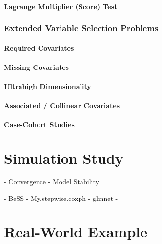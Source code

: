 \subsection{Lagrange Multiplier (Score) Test}

\section{Extended Variable Selection Problems}
\subsection{Required Covariates}
\subsection{Missing Covariates}
\subsection{Ultrahigh Dimensionality}
\subsection{Associated / Collinear Covariates}
\subsection{Case-Cohort Studies}

\part{Simulation Study}
- Convergence
- Model Stability


- BeSS
- My.stepwise.coxph
- glmnet
- 

\part{Real-World Example}
